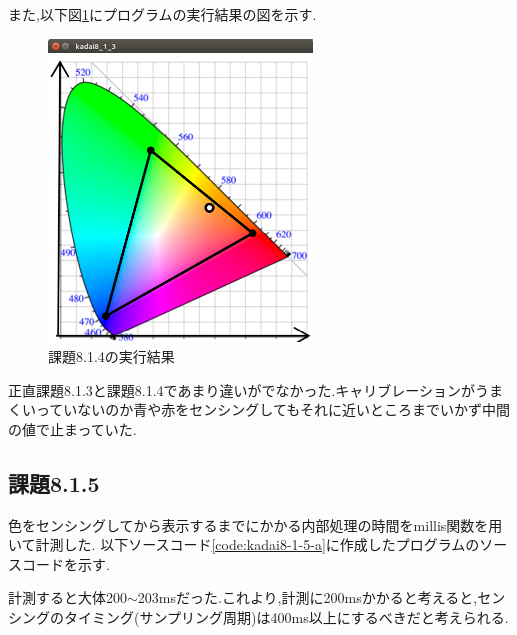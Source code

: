 \documentclass{jarticle}
\begin{document}


また,以下図\ref{fig:kadai8-1-4}にプログラムの実行結果の図を示す.

\begin{figure}[H]
\begin{center}
\includegraphics[width=7.0cm]{images/kadai8-1-4.png}
\caption{課題8.1.4の実行結果}
\label{fig:kadai8-1-4}
\end{center}
\end{figure}

正直課題8.1.3と課題8.1.4であまり違いがでなかった.キャリブレーションがうまくいっていないのか青や赤をセンシングしてもそれに近いところまでいかず中間の値で止まっていた.

\subsection{課題8.1.5}
色をセンシングしてから表示するまでにかかる内部処理の時間をmillis関数を用いて計測した.
以下ソースコード\ref{code:kadai8-1-5-a}に作成したプログラムのソースコードを示す.



計測すると大体200$\sim$203msだった.これより,計測に200msかかると考えると,センシングのタイミング(サンプリング周期)は400ms以上にするべきだと考えられる.
\end{document}
